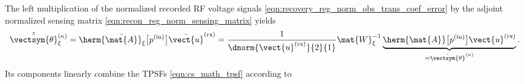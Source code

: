 The left multiplication of
the normalized recorded \ac{RF} voltage signals
\eqref{eqn:recovery_reg_norm_obs_trans_coef_error} by
the adjoint normalized sensing matrix
\eqref{eqn:recon_reg_norm_sensing_matrix} yields
\begin{equation*}
  \check{\bar{\vectsym{\theta}}}_{\xi}^{(\kappa)}
  =
  \herm{ \bar{\mat{A}} }_{\xi}\bigl[ p^{(\text{in})} \bigr]
  \bar{\vect{u}}^{(\text{rx})}
  =
  \frac{ 1 }{ \dnorm{ \vect{u}^{(\text{rx})} }{2}{1} }
  \mat{W}_{\xi}^{-1}
  \underbrace{
    \herm{ \mat{A} }\bigl[ p^{(\text{in})} \bigr]
    \vect{u}^{(\text{rx})}
  }_{ = \check{\vectsym{\theta}}^{(\kappa)} }.
\end{equation*}
Its components linearly combine
the \acp{TPSF}
\eqref{eqn:cs_math_tpsf} according to
